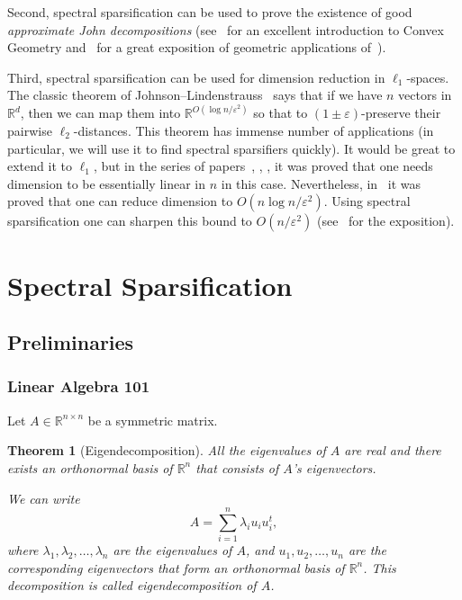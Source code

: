 \documentclass[12pt]{article}
\newcommand{\eps}{\varepsilon}
\newtheorem{theorem}{Theorem}
\begin{document}
    Second, spectral sparsification can be used to prove the existence of good \emph{approximate John decompositions}
    (see~\cite{B97} for an excellent introduction to Convex Geometry and~\cite{N11} for a great exposition of geometric
    applications of~\cite{BSS09}).

    Third, spectral sparsification can be used for dimension reduction in $\ell_1$-spaces.
    The classic theorem of Johnson--Lindenstrauss~\cite{DG03}
    says that if we have $n$ vectors in $\mathbb{R}^d$, then we can map them into $\mathbb{R}^{O(\log n / \eps^2)}$
    so that to $(1\pm\eps)$-preserve their pairwise $\ell_2$-distances.
    This theorem has immense number of applications (in particular, we will use it to find spectral sparsifiers quickly).
    It would be great to extend it to $\ell_1$, but in the series of papers~\cite{BC05}, \cite{LN04}, \cite{ACNN11},
    \cite{R11a} it was proved that one needs dimension to be essentially linear in $n$ in this case.
    Nevertheless, in~\cite{T90}
    it was proved that one can reduce dimension to $O(n \log n / \eps^2)$. Using spectral sparsification one can sharpen
    this bound to $O(n / \eps^2)$ (see~\cite{N11} for the exposition).

    \section{Spectral Sparsification}

    \subsection{Preliminaries}

    \subsubsection{Linear Algebra 101}

    Let $A \in \mathbb{R}^{n \times n}$ be a symmetric matrix. 
    \begin{theorem}[Eigendecomposition]
        All the eigenvalues
        of $A$ are real and there exists an orthonormal basis of $\mathbb{R}^n$
        that consists of $A$'s eigenvectors.

        We can write
        $$
            A = \sum_{i=1}^n \lambda_i u_i u_i^t,
        $$
        where $\lambda_1, \lambda_2, \ldots, \lambda_n$ are the eigenvalues of $A$, and
        $u_1, u_2, \ldots, u_n$ are the corresponding eigenvectors that form an orthonormal
        basis of $\mathbb{R}^n$. This decomposition is called \emph{eigendecomposition}
        of $A$.
    \end{theorem}
\end{document}
